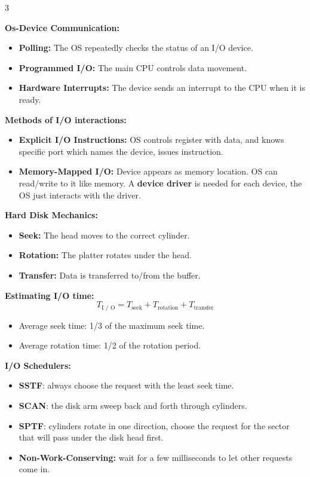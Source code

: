 \documentclass[8pt]{innovativeinnovation-cheatsheet}
\begin{document}
\begin{multicols*}{3}

\textbf{Os-Device Communication:}
\begin{itemize}
      \item \textbf{Polling:} The OS repeatedly checks the status of an I/O device.
      \item \textbf{Programmed I/O:} The main CPU controls data movement.
      \item \textbf{Hardware Interrupts:} The device sends an interrupt to the CPU when it is ready.
\end{itemize}

\textbf{Methods of I/O interactions:}
\begin{itemize}
      \item \textbf{Explicit I/O Instructions:} OS controls register with data, and knows specific port which names the device, issues instruction.
      \item \textbf{Memory-Mapped I/O:} Device appears as memory location. OS can read/write to it like memory. A \textbf{device driver} is needed for each device, the OS just interacts with the driver.
\end{itemize}

\textbf{Hard Disk Mechanics:}
\begin{itemize}
      \item \textbf{Seek:} The head moves to the correct cylinder.
      \item \textbf{Rotation:} The platter rotates under the head.
      \item \textbf{Transfer:} Data is transferred to/from the buffer.
\end{itemize}
\textbf{Estimating I/O time:}
\begin{equation*}
      T_{\text{I / O}} = T_{\text{seek}} + T_{\text{rotation}} + T_{\text{transfer}}
\end{equation*}
\begin{itemize}
      \item Average seek time: 1/3 of the maximum seek time.
      \item Average rotation time: 1/2 of the rotation period.
\end{itemize}

\textbf{I/O Schedulers:}
\begin{itemize}
      \item \textbf{SSTF}: always choose the request with the least seek time.
      \item \textbf{SCAN}: the disk arm sweep back and forth through cylinders.
      \item \textbf{SPTF}: cylinders rotate in one direction, choose the request for the sector that will pass under the disk head first.
      \item \textbf{Non-Work-Conserving:} wait for a few milliseconds to let other requests come in.
\end{itemize}


\end{multicols*}
\end{document}
